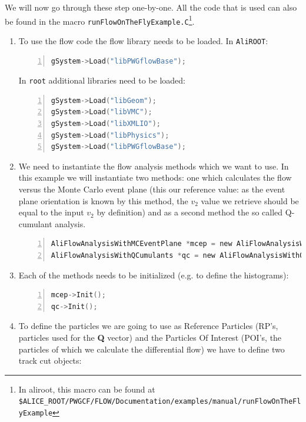 \documentclass[a4paper]{book}
\numberwithin{equation}{subsection}
\begin{document}
We will now go through these step one-by-one. All the code that is used can also be found in the macro \texttt{runFlowOnTheFlyExample.C}\footnote{In aliroot, this macro can be found at \\ \texttt{\$ALICE\_ROOT/PWGCF/FLOW/Documentation/examples/manual/runFlowOnTheFlyExample}}.
\begin{enumerate}
	\item To use the flow code the flow library needs to be loaded. In \texttt{AliROOT}:
	\begin{lstlisting}[language=C, numbers=left]
gSystem->Load("libPWGflowBase");\end{lstlisting}
	In \texttt{root} additional libraries need to be loaded: 
        \begin{lstlisting}[language=C, numbers=left]
gSystem->Load("libGeom");
gSystem->Load("libVMC");
gSystem->Load("libXMLIO");
gSystem->Load("libPhysics");
gSystem->Load("libPWGflowBase");\end{lstlisting}
	\item We need to instantiate the flow analysis methods which we want to use. In this example we will
            instantiate two methods: one which calculates the flow versus the Monte Carlo event plane (this our reference value: as the event plane orientation is known by this method, the $v_2$ value we retrieve should be equal to the input $v_2$ by definition) and as a second method the so called Q-cumulant analysis.
\begin{lstlisting}[language=C, numbers=left]
AliFlowAnalysisWithMCEventPlane *mcep = new AliFlowAnalysisWithMCEventPlane();
AliFlowAnalysisWithQCumulants *qc = new AliFlowAnalysisWithQCumulants();\end{lstlisting}
	\item Each of the methods needs to be initialized (e.g. to define the histograms): 
\begin{lstlisting}[language=C, numbers=left]
mcep->Init(); 
qc->Init();\end{lstlisting}
	\item To define the particles we are going to use as Reference Particles  (RP's, particles 
	used for the {\bf Q} vector) and the Particles Of Interest  (POI's, the particles of which we calculate the differential flow) we have to define two track cut objects:

\end{enumerate}
\end{document}

